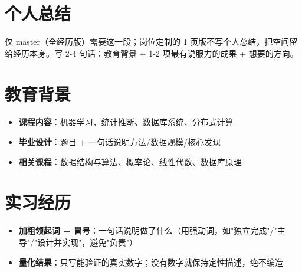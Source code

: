 \documentclass{my-resume}
\begin{document}


\section{个人总结}
仅 master（全经历版）需要这一段；岗位定制的 1 页版不写个人总结，把空间留给经历本身。写 2-4 句话：教育背景 + 1-2 项最有说服力的成果 + 想要的方向。

\section{教育背景}
\begin{itemize}[parsep=0.2ex]
  \item \textbf{课程内容}：机器学习、统计推断、数据库系统、分布式计算
  \item \textbf{毕业设计}：题目 + 一句话说明方法/数据规模/核心发现
\end{itemize}
\begin{itemize}[parsep=0.2ex]
  \item \textbf{相关课程}：数据结构与算法、概率论、线性代数、数据库原理
\end{itemize}

\section{实习经历}
\begin{itemize}[parsep=0.2ex]
  \item \textbf{加粗领起词 + 冒号}：一句话说明做了什么（用强动词，如"独立完成"/"主导"/"设计并实现"，避免"负责"）
  \item \textbf{量化结果}：只写能验证的真实数字；没有数字就保持定性描述，绝不编造
\end{itemize}
\end{document}
